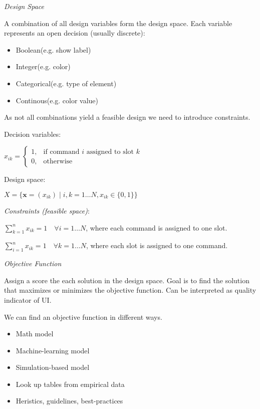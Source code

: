\textit{Design Space} \smallskip

A combination of all design variables form the design space. Each variable represents an open decision (usually discrete):

\begin{itemize}[itemsep=-5pt, topsep=0pt, leftmargin=*]
	\item Boolean(e.g. show label)
	\item Integer(e.g. color)
	\item Categorical(e.g. type of element)
	\item Continous(e.g. color value)
\end{itemize}

As not all combinations yield a feasible design we need to introduce constraints. \medskip

Decision variables: \smallskip

$x_{ik} = 
\begin{cases} 
1, & \text{if command } i \text{ assigned to slot } k \\
0, & \text{otherwise}
\end{cases}$ \medskip

Design space: \smallskip

$X = \{ \mathbf{x} = (x_{ik}) \mid i,k = 1 \ldots N, x_{ik} \in \{0,1\} \}$ \medskip

\textit{Constraints (feasible space)}: \medskip

$\sum_{k=1}^{n} x_{ik} = 1 \quad \forall i = 1 \ldots N$, where each command is assigned to one slot. 


$\sum_{i=1}^{n} x_{ik} = 1 \quad \forall k = 1 \ldots N$, where each slot is assigned to one command.\medskip

\textit{Objective Function} \medskip

Assign a score the each solution in the design space. Goal is to find the solution that maximizes or minimizes the objective function.
Can be interpreted as quality indicator of UI. \smallskip

We can find an objective function in different ways.

\begin{itemize}[itemsep=-5pt, topsep=0pt, leftmargin=*]
	\item Math model
	\item Machine-learning model
	\item Simulation-based model
	\item Look up tables from empirical data
	\item Heristics, guidelines, best-practices
\end{itemize}

